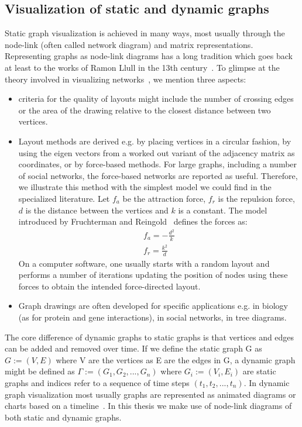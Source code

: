\subsection{Visualization of static and dynamic graphs}
Static graph visualization is achieved in many ways,
most usually through the node-link (often called network diagram)
and matrix representations.
Representing graphs as node-link diagrams has a long tradition which goes back 
at least to the works of Ramon Llull in the 13th century~\cite{llull}.
To glimpse at the theory involved in visualizing networks~\cite{eades}, we mention three aspects:
\begin{itemize}
\item criteria for the quality of layouts might include the number of crossing edges or the area of the drawing relative to the closest distance between two vertices.
\item Layout methods are derived e.g. by placing vertices in a circular fashion, by using the eigen vectors from a worked out variant of the adjacency matrix as coordinates, or by force-based methods. For large graphs, including a number of social networks, the force-based networks are reported as useful. Therefore, we illustrate this method with the simplest model we could find in the specialized literature. Let $f_a$ be the attraction force, $f_r$ is the repulsion force, $d$ is the distance between the vertices and $k$ is a constant. The model introduced by Fruchterman and Reingold~\cite{fr} defines the forces as:
\begin{align}
f_a = -\frac{d^2}{k}\\
f_r = \frac{k^2}{d}
\end{align}
On a computer software, one usually starts with a random layout and performs a number of iterations updating the position of nodes
using these forces to obtain the intended force-directed layout.
\item Graph drawings are often developed for specific applications e.g. in biology (as for protein and gene interactions), in social networks, in tree diagrams.
\end{itemize}

The core difference of dynamic graphs to static graphs is that vertices and edges
can be added and removed over time.
If we define the static graph G as $G:=(V,E)$ where V are the vertices as E are the edges in G,
a dynamic graph might be defined as $\Gamma:=(G_1,G_2,...,G_n)$ where $G_i:=(V_i,E_i)$
are static graphs and indices refer to a sequence of time steps $(t_1,t_2,...,t_n)$.
In dynamic graph visualization most usually graphs are represented as animated diagrams
or charts based on a timeline~\cite{dynGraph}.
In this thesis we make use of node-link diagrams of both static and dynamic graphs.

